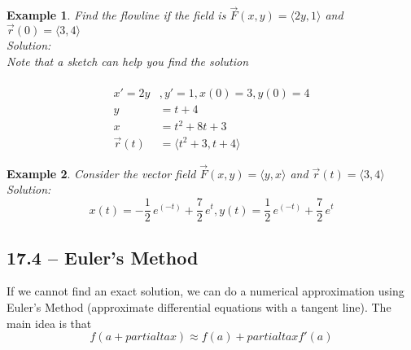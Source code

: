 \documentclass[11pt]{article}
\newtheorem{ex}{Example}
\begin{document}
\begin{ex}
  Find the flowline if the field is $\vec{F}(x,y) = \langle 2y, 1 \rangle$
  and $\vec{r}(0) = \langle 3, 4 \rangle$ \\
  Solution:\\
  Note that a sketch can help you find the solution\\
\\
  \begin{align*}
    x' = 2y &, y' = 1, x(0) = 3, y(0) = 4 \\
    y &= t +  4\\
    x &= t^{2}  + 8t +  3\\
    \vec{r}(t) &= \langle t^{2} + 3, t  + 4\rangle
  \end{align*}
\end{ex}
\begin{ex}
  Consider the vector field $\vec{F}(x,y) = \langle y, x \rangle$ and $\vec{r}(t) = \langle 3, 4 \rangle$
  Solution: \\
  \[x\left(t\right) = -\frac{1}{2} \, e^{\left(-t\right)} + \frac{7}{2} \, e^{t}, y\left(t\right) = \frac{1}{2} \, e^{\left(-t\right)} + \frac{7}{2} \, e^{t}
\]
\end{ex}
\subsection{17.4 -- Euler's Method}
If we cannot find an exact solution, we can do a numerical approximation using Euler's Method (approximate differential equations with a tangent line).
The main idea is that
\[f(a + partialta x) \approx f(a) + partialta x f'(a)\]
\end{document}
